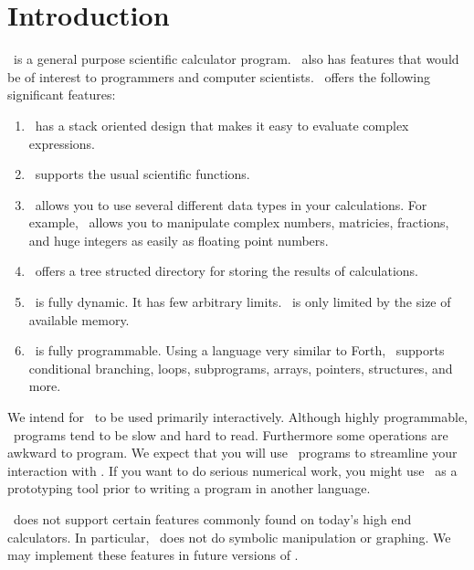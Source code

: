 
\chapter{Introduction}

\CLAC\ is a general purpose scientific calculator program. \CLAC\ also has features that would
be of interest to programmers and computer scientists. \CLAC\ offers the following significant
features:

\begin{enumerate}
  
\item \CLAC\ has a stack oriented design that makes it easy to evaluate complex expressions.
  
\item \CLAC\ supports the usual scientific functions.
  
\item \CLAC\ allows you to use several different data types in your calculations. For example,
  \CLAC\ allows you to manipulate complex numbers, matricies, fractions, and huge integers as
  easily as floating point numbers.
  
\item \CLAC\ offers a tree structed directory for storing the results of calculations.
  
\item \CLAC\ is fully dynamic. It has few arbitrary limits. \CLAC\ is only limited by the size
  of available memory.
  
\item \CLAC\ is fully programmable. Using a language very similar to Forth, \CLAC\ supports
  conditional branching, loops, subprograms, arrays, pointers, structures, and more.

\end{enumerate}

We intend for \CLAC\ to be used primarily interactively. Although highly programmable, \CLAC\
programs tend to be slow and hard to read. Furthermore some operations are awkward to program.
We expect that you will use \CLAC\ programs to streamline your interaction with \CLAC. If you
want to do serious numerical work, you might use \CLAC\ as a prototyping tool prior to writing a
program in another language.

\CLAC\ does not support certain features commonly found on today's high end calculators. In
particular, \CLAC\ does not do symbolic manipulation or graphing. We may implement these
features in future versions of \CLAC.

